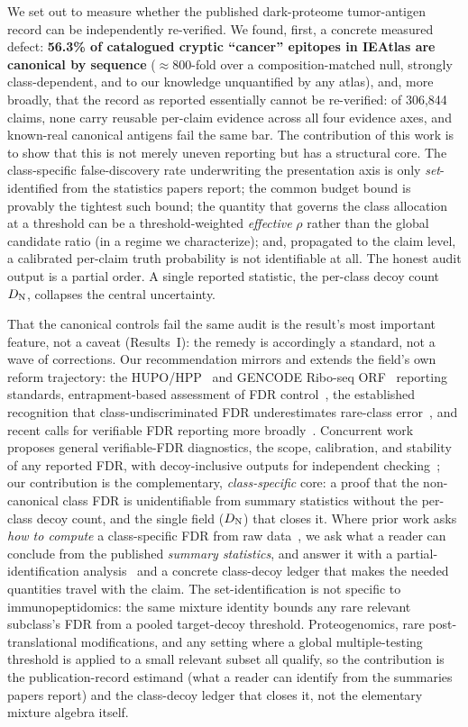 We set out to measure whether the published dark-proteome tumor-antigen record can be independently re-verified. We found, first, a concrete measured defect: \textbf{56.3\% of catalogued cryptic ``cancer'' epitopes in IEAtlas are canonical by sequence} ($\approx$800-fold over a composition-matched null, strongly class-dependent, and to our knowledge unquantified by any atlas), and, more broadly, that the record as reported essentially cannot be re-verified: of 306{,}844 claims, none carry reusable per-claim evidence across all four evidence axes, and known-real canonical antigens fail the same bar. The contribution of this work is to show that this is not merely uneven reporting but has a structural core. The class-specific false-discovery rate underwriting the presentation axis is only \emph{set}-identified from the statistics papers report; the common budget bound is provably the tightest such bound; the quantity that governs the class allocation at a threshold can be a threshold-weighted \emph{effective} $\rho$ rather than the global candidate ratio (in a regime we characterize); and, propagated to the claim level, a calibrated per-claim truth probability is not identifiable at all. The honest audit output is a partial order. A single reported statistic, the per-class decoy count $D_{\mathrm{N}}$, collapses the central uncertainty.

That the canonical controls fail the same audit is the result's most important feature, not a caveat (Results~I): the remedy is accordingly a standard, not a wave of corrections. Our recommendation mirrors and extends the field's own reform trajectory: the HUPO/HPP~\cite{r17} and GENCODE Ribo-seq ORF~\cite{r16} reporting standards, entrapment-based assessment of FDR control~\cite{r8}, the established recognition that class-undiscriminated FDR underestimates rare-class error~\cite{r4,r5,r19}, and recent calls for verifiable FDR reporting more broadly~\cite{r21}. Concurrent work proposes general verifiable-FDR diagnostics, the scope, calibration, and stability of any reported FDR, with decoy-inclusive outputs for independent checking~\cite{r21}; our contribution is the complementary, \emph{class-specific} core: a proof that the non-canonical class FDR is unidentifiable from summary statistics without the per-class decoy count, and the single field ($D_{\mathrm{N}}$) that closes it. Where prior work asks \emph{how to compute} a class-specific FDR from raw data~\cite{r5,r10,r11,r22}, we ask what a reader can conclude from the published \emph{summary statistics}, and answer it with a partial-identification analysis~\cite{r18} and a concrete class-decoy ledger that makes the needed quantities travel with the claim. The set-identification is not specific to immunopeptidomics: the same mixture identity bounds any rare relevant subclass's FDR from a pooled target-decoy threshold. Proteogenomics, rare post-translational modifications, and any setting where a global multiple-testing threshold is applied to a small relevant subset all qualify, so the contribution is the publication-record estimand (what a reader can identify from the summaries papers report) and the class-decoy ledger that closes it, not the elementary mixture algebra itself.


